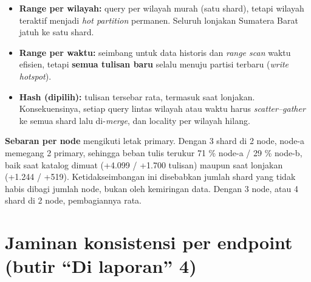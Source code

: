 \begin{itemize}
\item \textbf{Range per wilayah:} query per wilayah murah (satu shard), tetapi wilayah teraktif menjadi \emph{hot partition} permanen. Seluruh lonjakan Sumatera Barat jatuh ke satu shard.
\item \textbf{Range per waktu:} seimbang untuk data historis dan \emph{range scan} waktu efisien, tetapi \textbf{semua tulisan baru} selalu menuju partisi terbaru (\emph{write hotspot}).
\item \textbf{Hash (dipilih):} tulisan tersebar rata, termasuk saat lonjakan. Konsekuensinya, setiap query lintas wilayah atau waktu harus \emph{scatter--gather} ke semua shard lalu di-\emph{merge}, dan locality per wilayah hilang.
\end{itemize}

\textbf{Sebaran per node} mengikuti letak primary. Dengan 3 shard di 2 node, node-a memegang 2 primary, sehingga beban tulis terukur 71 \% node-a / 29 \% node-b, baik saat katalog dimuat (+4.099 / +1.700 tulisan) maupun saat lonjakan (+1.244 / +519). Ketidakseimbangan ini disebabkan jumlah shard yang tidak habis dibagi jumlah node, bukan oleh kemiringan data. Dengan 3 node, atau 4 shard di 2 node, pembagiannya rata.


\section{Jaminan konsistensi per endpoint (butir ``Di laporan'' 4)}

